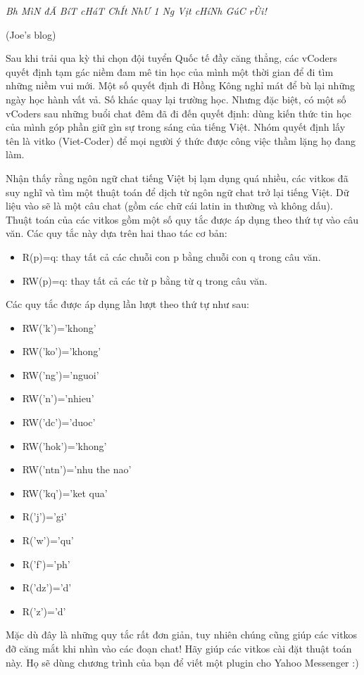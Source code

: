 \textit{    Bh MìN đÃ BíT cHáT ChÍt NhƯ 1 Ng Vịt cHíNh GúC rÙi!   }


   (Joe's blog)    

   Sau khi trải qua kỳ thi chọn đội tuyển Quốc tế đầy căng thẳng, các vCoders quyết định tạm gác niềm đam mê tin học của mình một thời gian để đi tìm những niềm vui mới. Một số quyết định đi Hồng Kông nghỉ mát để bù lại những ngày học hành vất vả. Số khác quay lại trường học. Nhưng đặc biệt, có một số vCoders sau những buổi chat đêm đã đi đến quyết định: dùng kiến thức tin học của mình góp phần giữ gìn sự trong sáng của tiếng Việt. Nhóm quyết định lấy tên là vitko (Viet-Coder) để mọi người ý thức được công việc thầm lặng họ đang làm.  

   Nhận thấy rằng ngôn ngữ chat tiếng Việt bị lạm dụng quá nhiều, các vitkos đã suy nghĩ và tìm một thuật toán để dịch từ ngôn ngữ chat trở lại tiếng Việt. Dữ liệu vào sẽ là một câu chat (gồm các chữ cái latin in thường và không dấu). Thuật toán của các vitkos gồm một số quy tắc được áp dụng theo thứ tự vào câu văn. Các quy tắc này dựa trên hai thao tác cơ bản:  
\begin{itemize}
	\item     R(p)=q: thay tất cả các chuỗi con p bằng chuỗi con q trong câu văn.   
	\item     RW(p)=q: thay tất cả các từ p bằng từ q trong câu văn.   
\end{itemize}

   Các quy tắc được áp dụng lần lượt theo thứ tự như sau:  
\begin{itemize}
	\item     RW('k')='khong'   
	\item     RW('ko')='khong'   
	\item     RW('ng')='nguoi'   
	\item     RW('n')='nhieu'   
	\item     RW('dc')='duoc'   
	\item     RW('hok')='khong'   
	\item     RW('ntn')='nhu the nao'   
	\item     RW('kq')='ket qua'   
	\item     R('j')='gi'   
	\item     R('w')='qu'   
	\item     R('f')='ph'   
	\item     R('dz')='d'   
	\item     R('z')='d'   
\end{itemize}

   Mặc dù đây là những quy tắc rất đơn giản, tuy nhiên chúng cũng giúp các vitkos đỡ căng mắt khi nhìn vào các đoạn chat! Hãy giúp các vitkos cài đặt thuật toán này. Họ sẽ dùng chương trình của bạn để viết một plugin cho Yahoo Messenger :)